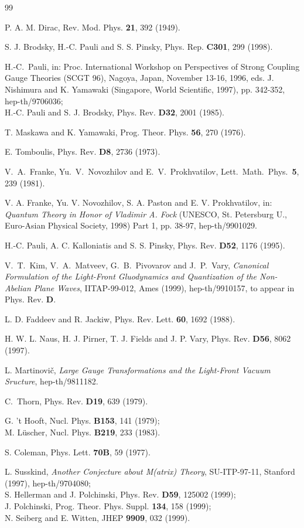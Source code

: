 \documentclass[a4paper,12pt]{article}
\begin{document}
\begin{thebibliography} {99}

P. A. M. Dirac, Rev. Mod. Phys. {\bf 21}, 392 (1949).

S. J. Brodsky, H.-C. Pauli and S. S. Pinsky, Phys. Rep. {\bf C301}, 299 (1998).

H.-C.~Pauli,
in: Proc. International Workshop on Perspectives of Strong Coupling Gauge
Theories (SCGT 96), Nagoya, Japan, November 13-16, 1996, 
eds. J. Nishimura and K. Yamawaki (Singapore, World Scientific, 1997),
pp. 342-352, hep-th/9706036; \\
H.-C. Pauli and S. J. Brodsky, 
Phys. Rev. {\bf D32}, 2001 (1985). 

T. Maskawa and K. Yamawaki, Prog. Theor. Phys. {\bf 56}, 270 (1976). 

E. Tomboulis, Phys. Rev. {\bf D8}, 2736 (1973). 

V.~A.~Franke, Yu.~V.~Novozhilov and E.~V.~Prokhvatilov,
Lett.\ Math.\ Phys.\  {\bf 5}, 239 (1981).

V. A. Franke, Yu. V. Novozhilov, S. A. Paston and E. V. Prokhvatilov, 
in: {\it Quantum Theory in Honor of Vladimir A. Fock}
(UNESCO, St. Petersburg U., Euro-Asian Physical Society, 1998) Part 1, 
pp. 38-97, hep-th/9901029.

H.-C. Pauli, A. C. Kalloniatis and S. S. Pinsky, 
Phys. Rev. {\bf D52}, 1176 (1995). 

 V.~T.~Kim, V.~A.~Matveev, G.~B.~Pivovarov and J.~P.~Vary,
{\it Canonical Formulation of the Light-Front Gluodynamics
and Quantization of the Non-Abelian Plane Waves},
IITAP-99-012, Ames (1999), hep-th/9910157, 
to appear in Phys. Rev. {\bf D}. 

L. D. Faddeev and R. Jackiw, Phys. Rev. Lett. {\bf 60}, 1692 (1988).

H. W. L. Naus, H. J. Pirner, T. J. Fields and J. P. Vary,
Phys. Rev. {\bf D56}, 8062 (1997).

L. Martinovi\v{c}, {\it Large Gauge Transformations and the Light-Front
Vacuum Sructure}, hep-th/9811182.


C.~Thorn,
Phys. Rev. {\bf D19}, 639 (1979).


G. 't Hooft, Nucl. Phys. {\bf B153}, 141 (1979); \\
M. L\"uscher, Nucl. Phys. {\bf B219}, 233 (1983).

S. Coleman, Phys. Lett. {\bf 70B}, 59 (1977).

L. Susskind, {\it Another Conjecture about M(atrix) Theory}, 
SU-ITP-97-11, Stanford (1997), hep-th/9704080; \\
S. Hellerman and J. Polchinski, 
Phys. Rev. {\bf D59}, 125002 (1999); \\
J. Polchinski, 
Prog. Theor. Phys. Suppl. {\bf 134}, 158 (1999); \\
N. Seiberg and E. Witten,
JHEP {\bf 9909}, 032 (1999). 


\end{thebibliography}
\end{document}
